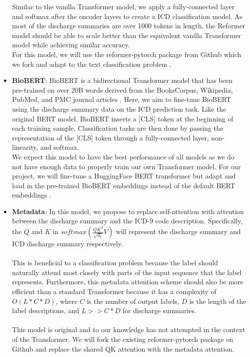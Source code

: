 \documentclass{article}
\begin{document}
\begin{itemize}
			Similar to the vanilla Transformer model, we apply a fully-connected layer and softmax after the encoder layers to create a ICD classification model. As most of the discharge summaries are over 1000 tokens in length, the Reformer model should be able to scale better than the equivalent vanilla Transformer model while achieving similar accuracy. \\
    			For this model, we will use the reformer-pytorch package from Github which we fork and adapt to the text classification problem \cite{reformerpytorch}. 
    		\item
    			\textbf{BioBERT}:	BioBERT is a bidirectional Transformer model that has been pre-trained on over 20B words derived from the BooksCorpus, Wikipedia, PubMed, and PMC journal articles \cite{lee2020biobert}. Here, we aim to fine-tune BioBERT using the discharge summary data on the ICD prediction task. Like the original BERT model, BioBERT inserts a [CLS] token at the beginning of each training sample. Classification tasks are then done by passing the representation of the [CLS] token through a fully-connected layer, non-linearity, and softmax. \\
    		We expect this model to have the best performance of all models as we do not have enough data to properly train our own Transformer model. For our project, we will fine-tune a  HuggingFace BERT transformer but adapt and load in the pre-trained BioBERT embeddings instead of the default BERT embeddings \cite{huggingface}. 
    		\item
    			\textbf{Metadata}: In this model, we propose to replace self-attention with attention between the discharge summary and the ICD-9 code description. Specifically, the $Q$ and $K$ in $softmax(\frac{QK^T}{\sqrt{d_k}}V)$ will represent the discharge summary and ICD discharge summary respectively. \\\\
    		This is beneficial to a classification problem because the label should naturally attend most closely with parts of the input sequence that the label represents. Furthermore, this metadata attention scheme should also be more efficient than a standard Transformer because it has a complexity of $O(L * C * D)$, where $C$ is the number of output labels, $D$ is the length of the label descriptions, and $L >> C * D$ for discharge summaries. \\\\
    		This model is original and to our knowledge has not attempted in the context of the Transformer. We will fork the existing reformer-pytorch package on Github and replace the shared QK attention with the metadata attention. \\\\
    	\end{itemize}
    	
\end{document}
